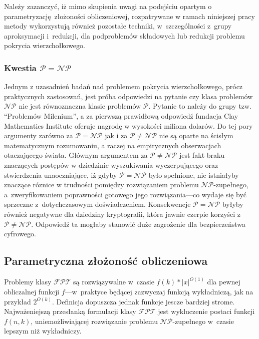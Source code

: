 {Należy zazanczyć, iż mimo skupienia uwagi na podejściu opartym o parametryzację złożoności obliczeniowej, rozpatrywane w ramach niniejszej pracy metody wykorzystują również pozostałe techniki, w~szczególności z~grupy aproksymacji i~redukcji, dla podproblemów składowych lub redukcji problemu pokrycia wierzchołkowego.
}
\subsubsection{\textbf{Kwestia $\mathcal{P}=\mathcal{NP}$}}
\label{sss_problem_p_neq_np}
\par{
  Jednym z uzasadnień badań nad problemem pokrycia wierzchołkowego, prócz
  praktycznych zastosowań, jest próba odpowiedzi na pytanie czy klasa problemów
  $\mathcal{NP}$ nie jest równoznaczna klasie problemów $\mathcal{P}$.
  Pytanie to należy do grupy tzw. ``Problemów Milenium'', a za pierwszą
  prawidłową odpowiedź fundacja Clay Mathematics Institute oferuje nagrodę w
  wysokości miliona dolarów. 
  Do tej pory argumenty zarówno za $\mathcal{P}=\mathcal{NP}$ jak i za
  $\mathcal{P}\neq\mathcal{NP}$ nie są oparte na ścisłym matematycznym
  rozumowaniu, a raczej na empirycznych obserwacjach otaczającego świata.
  Głównym argumentem za $\mathcal{P}\neq\mathcal{NP}$ jest fakt braku znaczących
  postępów w dziedzinie wyszukiwania wyczerpującego oraz stwierdzenia
  unaoczniające, iż gdyby $\mathcal{P}=\mathcal{NP}$ było spełnione, nie 
  istniałyby znaczące róznice w trudności pomiędzy rozwiązaniem 
  problemu $\mathcal{NP}$-zupełnego, a~zweryfikowaniem poprawności gotowego 
  jego rozwiązania---co wydaje się być sprzeczne z~dotychczasowym doświadczeniem.
  Konsekwencje $\mathcal{P}=\mathcal{NP}$ byłyby również negatywne dla dziedziny
  kryptografii, która jawnie czerpie korzyści z $\mathcal{P}\neq\mathcal{NP}$.
  Odpowiedź ta mogłaby stanowić duże zagrożenie dla bezpieczeństwa cyfrowego.
}

\subsection{Parametryczna złożoność obliczeniowa}
\label{sss_parametric_complexity}
\par{
  Problemy klasy $\mathcal{FPT}$ są rozwiązywalne w~czasie $f(k)*|x|^{O(1)}$ dla
  pewnej obliczalnej funkcji $f$---w~praktyce będącej zazwyczaj funkcją 
  wykładniczą, jak na przykład $2^{O(k)}$.
  Definicja dopuszcza jednak funkcje jescze bardziej strome.
  Najważeniejszą przesłanką formulacji klasy $\mathcal{FPT}$ jest wykluczenie
  postaci funkcji $f(n,k)$, uniemożliwiającej rozwiązanie problemu 
  $\mathcal{NP}$-zupełnego w~czasie lepszym niż wykładniczy.
}

